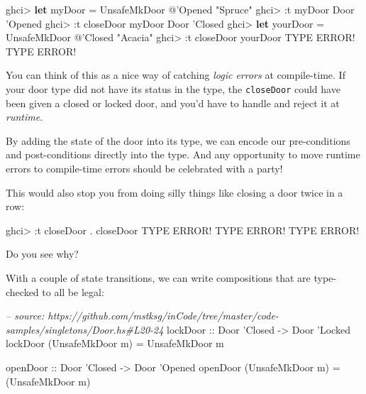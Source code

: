 \documentclass[]{article}
\newenvironment{Shaded}{\begin{snugshade}}{\end{snugshade}}
\newcommand{\CharTok}[1]{\textcolor[rgb]{0.31,0.60,0.02}{#1}}
\newcommand{\CommentTok}[1]{\textcolor[rgb]{0.56,0.35,0.01}{\textit{#1}}}
\newcommand{\DataTypeTok}[1]{\textcolor[rgb]{0.13,0.29,0.53}{#1}}
\newcommand{\FunctionTok}[1]{\textcolor[rgb]{0.00,0.00,0.00}{#1}}
\newcommand{\KeywordTok}[1]{\textcolor[rgb]{0.13,0.29,0.53}{\textbf{#1}}}
\newcommand{\NormalTok}[1]{#1}
\newcommand{\OtherTok}[1]{\textcolor[rgb]{0.56,0.35,0.01}{#1}}
\begin{document}
\begin{Shaded}
\begin{Highlighting}[]
\NormalTok{ghci}\FunctionTok{>} \KeywordTok{let}\NormalTok{ myDoor }\FunctionTok{=} \DataTypeTok{UnsafeMkDoor} \FunctionTok{@}\CharTok{'Opened "Spruce"}
\NormalTok{ghci}\FunctionTok{>} \FunctionTok{:}\NormalTok{t myDoor}
\DataTypeTok{Door} \CharTok{'Opened}
\NormalTok{ghci}\FunctionTok{>} \FunctionTok{:}\NormalTok{t closeDoor myDoor}
\DataTypeTok{Door} \CharTok{'Closed}
\NormalTok{ghci}\FunctionTok{>} \KeywordTok{let}\NormalTok{ yourDoor }\FunctionTok{=} \DataTypeTok{UnsafeMkDoor} \FunctionTok{@}\CharTok{'Closed "Acacia"}
\NormalTok{ghci}\FunctionTok{>} \FunctionTok{:}\NormalTok{t closeDoor yourDoor}
\DataTypeTok{TYPE} \DataTypeTok{ERROR}\FunctionTok{!}  \DataTypeTok{TYPE} \DataTypeTok{ERROR}\FunctionTok{!}
\end{Highlighting}
\end{Shaded}

You can think of this as a nice way of catching \emph{logic errors} at
compile-time. If your door type did not have its status in the type, the
\texttt{closeDoor} could have been given a closed or locked door, and you'd have
to handle and reject it at \emph{runtime}.

By adding the state of the door into its type, we can encode our pre-conditions
and post-conditions directly into the type. And any opportunity to move runtime
errors to compile-time errors should be celebrated with a party!

This would also stop you from doing silly things like closing a door twice in a
row:

\begin{Shaded}
\begin{Highlighting}[]
\NormalTok{ghci}\FunctionTok{>} \FunctionTok{:}\NormalTok{t closeDoor }\FunctionTok{.}\NormalTok{ closeDoor}
\DataTypeTok{TYPE} \DataTypeTok{ERROR}\FunctionTok{!}  \DataTypeTok{TYPE} \DataTypeTok{ERROR}\FunctionTok{!}  \DataTypeTok{TYPE} \DataTypeTok{ERROR}\FunctionTok{!}
\end{Highlighting}
\end{Shaded}

Do you see why?

With a couple of state transitions, we can write compositions that are
type-checked to all be legal:

\begin{Shaded}
\begin{Highlighting}[]
\CommentTok{-- source: https://github.com/mstksg/inCode/tree/master/code-samples/singletons/Door.hs#L20-24}
\OtherTok{lockDoor ::} \DataTypeTok{Door} \CharTok{'Closed -> Door '}\DataTypeTok{Locked}
\NormalTok{lockDoor (}\DataTypeTok{UnsafeMkDoor}\NormalTok{ m) }\FunctionTok{=} \DataTypeTok{UnsafeMkDoor}\NormalTok{ m}

\OtherTok{openDoor ::} \DataTypeTok{Door} \CharTok{'Closed -> Door '}\DataTypeTok{Opened}
\NormalTok{openDoor (}\DataTypeTok{UnsafeMkDoor}\NormalTok{ m) }\FunctionTok{=}\NormalTok{ (}\DataTypeTok{UnsafeMkDoor}\NormalTok{ m)}
\end{Highlighting}
\end{Shaded}
\end{document}
